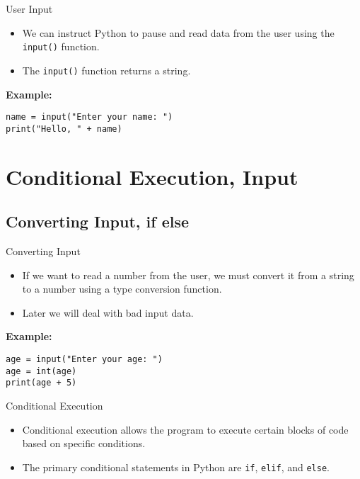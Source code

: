 \documentclass[serif, aspectratio=169]{beamer}
\begin{document}
\begin{frame}[fragile]{User Input}
    \begin{itemize}[<+-| alert@+>]
        \item We can instruct Python to pause and read data from the user using the \texttt{input()} function.
        \item The \texttt{input()} function returns a string.
    \end{itemize}
    \vspace{0.5cm}
    \textbf{Example:}
    \begin{verbatim}
name = input("Enter your name: ")
print("Hello, " + name)
    \end{verbatim}
\end{frame}
\section{Conditional Execution, Input}

\subsection{Converting Input, if else}

\begin{frame}[fragile]{Converting Input}
    \begin{itemize}[<+-| alert@+>]
        \item If we want to read a number from the user, we must convert it from a string to a number using a type conversion function.
        \item Later we will deal with bad input data.
    \end{itemize}
    \vspace{0.5cm}
    \textbf{Example:}
    \begin{verbatim}
age = input("Enter your age: ")
age = int(age)
print(age + 5)
    \end{verbatim}
\end{frame}

\begin{frame}{Conditional Execution}
    \begin{itemize}[<+-| alert@+>] %
        \item Conditional execution allows the program to execute certain blocks of code based on specific conditions.
        \item The primary conditional statements in Python are \texttt{if}, \texttt{elif}, and \texttt{else}.
    \end{itemize}
\end{frame}
\end{document}
